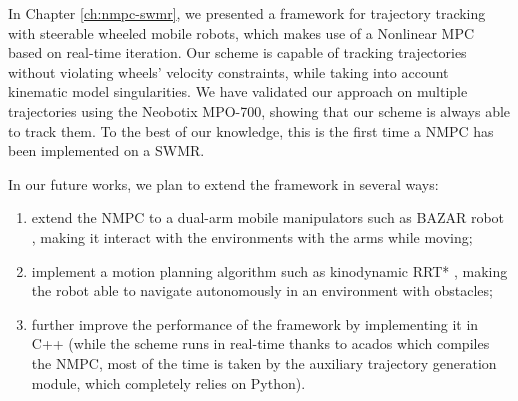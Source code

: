 \medskip

In Chapter \ref{ch:nmpc-swmr}, we presented a framework for trajectory tracking
with steerable wheeled mobile robots, which makes use of a Nonlinear MPC based
on real-time iteration. Our scheme is capable of tracking trajectories without
violating wheels' velocity constraints, while taking into account kinematic
model singularities. We have validated our approach on multiple trajectories
using the Neobotix MPO-700, showing that our scheme is always able to track
them. To the best of our knowledge, this is the first time a NMPC has been
implemented on a SWMR.

In our future works, we plan to extend the framework in several ways:
\begin{enumerate}
    \item extend the NMPC to a dual-arm mobile manipulators such as BAZAR robot
        \cite{Cherubini2019ACR}, making it interact with the environments with
        the arms while moving;
    \item implement a motion planning algorithm such as kinodynamic RRT*
        \cite{Webb2013KinodynamicRRTstar}, making the robot able to navigate
        autonomously in an environment with obstacles;
    \item further improve the performance of the framework by implementing it
        in C++ (while the scheme runs in real-time thanks to acados which
        compiles the NMPC, most of the time is taken by the auxiliary
        trajectory generation module, which completely relies on Python).
\end{enumerate}
